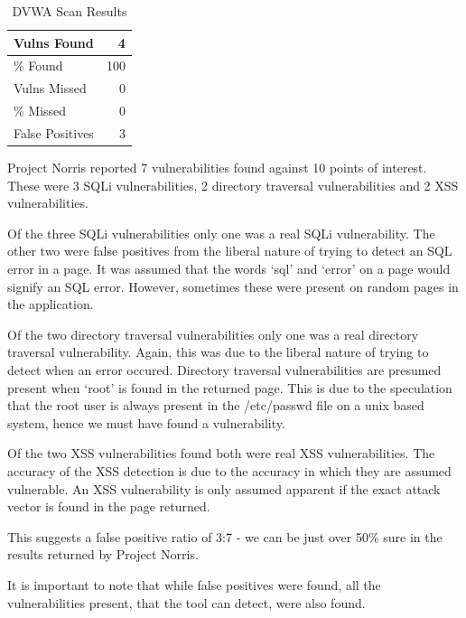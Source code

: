 \documentclass[12pt,a4paper]{article}
\begin{document}
\begin{center}
    \begin{table}
        \caption{DVWA Scan Results}
        \begin{center}
            \begin{tabular}{ | l | r | }
                \hline
                Vulns Found & 4 \\ \hline
                \% Found & 100 \\ \hline
                Vulns Missed & 0 \\ \hline
                \% Missed & 0 \\ \hline
                False Positives & 3 \\ 
                \hline
            \end{tabular}
        \end{center}
    \end{table}
\end{center}

Project Norris reported 7 vulnerabilities found against 10 points of interest.  These were 3 SQLi vulnerabilities, 2 directory traversal vulnerabilities and 2 XSS vulnerabilities.

Of the three SQLi vulnerabilities only one was a real SQLi vulnerability.  The other two were false positives from the liberal nature of trying to detect an SQL error in a page.  It was assumed that the words `sql' and `error' on a page would signify an SQL error.  However, sometimes these were present on random pages in the application.

Of the two directory traversal vulnerabilities only one was a real directory traversal vulnerability.  Again, this was due to the liberal nature of trying to detect when an error occured.  Directory traversal vulnerabilities are presumed present when `root' is found in the returned page.  This is due to the speculation that the root user is always present in the /etc/passwd file on a unix based system, hence we must have found a vulnerability.

Of the two XSS vulnerabilities found both were real XSS vulnerabilities.  The accuracy of the XSS detection is due to the accuracy in which they are assumed vulnerable.  An XSS vulnerability is only assumed apparent if the exact attack vector is found in the page returned.

This suggests a false positive ratio of 3:7 - we can be just over 50\% sure in the results returned by Project Norris.

It is important to note that while false positives were found, all the vulnerabilities present, that the tool can detect, were also found.
\end{document}
